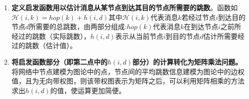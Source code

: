 \begin{itemize}
\begin{enumerate}
\item \textbf{定义启发函数用以估计消息从某节点到达其目的节点所需要的跳数}。函数如$
\label{eq:Hh}
\mathcal{H}(i,k) = hop(k) + h(i, d)
$其中$\mathcal{H}(i,k)$代表消息$k$若经过节点$i$到达目的节点$d$所需要的总跳数，由两部分组成:$hop(k)$代表消息$k$在到达节点$i$之前所经过的跳数（实际跳数），$h(i,d)$表示从当前节点$i$到目的节点$d$估计所需要经过的跳数（估计值）。

\item \textbf{将启发函数部分（即第二点中的$h(i,d)$部分）的计算转化为矩阵乘法问题。}将网络中节点建模为图论中的点，节点间的平均跳数信息建模为图论中的边权值，且为无向带权图，则该带权图表示为矩阵之后，可以利用矩阵相乘的方法求出$h(i,d)$的值，使运算更加简便。
\end{enumerate}
\end{itemize}